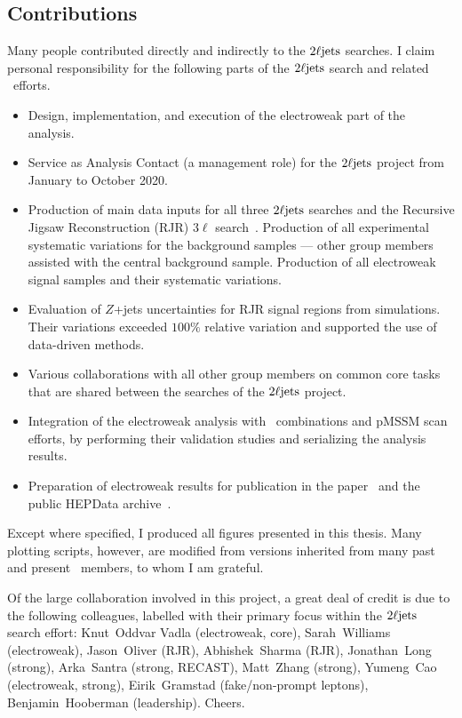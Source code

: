 \subsection{Contributions}
Many people contributed directly and indirectly to the $2\ell\mathrm{jets}$ searches.
I claim personal responsibility for the following parts of the $2\ell\mathrm{jets}$
search and related \atlas\ efforts.
\begin{itemize}
\item Design, implementation, and execution of the electroweak part of the
analysis.
\item Service as Analysis Contact (a management role) for the $2\ell\mathrm{jets}$
project from January to October 2020.
\item Production of main data inputs for all three $2\ell\mathrm{jets}$ searches
and the Recursive Jigsaw Reconstruction (RJR) $3\ell$
search~\cite{atlas_rjr_3l_SUSY_2019_09}.
Production of all experimental systematic variations for the background
samples --- other group members assisted with the central background sample.
Production of all electroweak signal samples and their systematic variations.
\item Evaluation of $Z$+jets uncertainties for RJR signal regions from
simulations. Their variations exceeded $100\%$ relative variation and supported
the use of data-driven methods.
\item Various collaborations with all other group members on common core tasks
that are shared between the searches of the $2\ell\mathrm{jets}$ project.
\item Integration of the electroweak analysis with \atlas\ combinations and
pMSSM scan efforts, by performing their validation studies and serializing the
analysis results.
\item Preparation of electroweak results for publication in the
paper~\cite{atlas2022searches} and the public HEPData
archive~\cite{maguire2017hepdata}.
\end{itemize}
Except where specified, I produced all figures presented in this thesis.
Many plotting scripts, however, are modified from versions inherited from
many past and present \atlas\ members, to whom I am grateful.

Of the large collaboration involved in this project, a great deal of credit is
due to the following colleagues, labelled with their primary focus within
the $2\ell\mathrm{jets}$ search effort:
Knut~Oddvar Vadla (electroweak, core),
Sarah~Williams (electroweak),
Jason~Oliver (RJR),
Abhishek~Sharma (RJR),
Jonathan~Long (strong),
Arka~Santra (strong, RECAST),
Matt~Zhang (strong),
Yumeng~Cao (electroweak, strong),
Eirik~Gramstad (fake/non-prompt leptons),
Benjamin~Hooberman (leadership).
Cheers.


